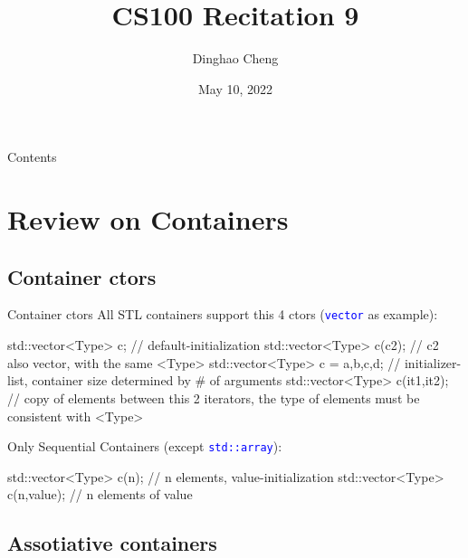 \documentclass{beamer}
\title{CS100 Recitation 9}
\author{Dinghao Cheng}
\date{May 10, 2022}
\newcommand{\blue}[1]{\textcolor{blue}{#1}}
\newcommand{\ttt}[1]{\texttt{#1}}
\newcommand{\bluett}[1]{\blue{\ttt{#1}}}
\begin{document}
\begin{frame}
    \maketitle
\end{frame}

\begin{frame}{Contents}
    \tableofcontents
\end{frame}

\section{Review on Containers}

\subsection{Container ctors}

\begin{frame}[fragile]{Container ctors}
    All STL containers support this 4 ctors (\bluett{vector} as example):
    \begin{cpp}
std::vector<Type> c; // default-initialization
std::vector<Type> c(c2); // c2 also vector, with the same <Type>
std::vector<Type> c = {a,b,c,d}; // initializer-list, container size determined by # of arguments
std::vector<Type> c(it1,it2); // copy of elements between this 2 iterators, the type of elements must be consistent with <Type>
    \end{cpp}
    Only Sequential Containers (except \bluett{std::array}):
    \begin{cpp}
std::vector<Type> c(n); // n elements, value-initialization
std::vector<Type> c(n,value); // n elements of value
    \end{cpp}
\end{frame}

\subsection{Assotiative containers}
\end{document}
